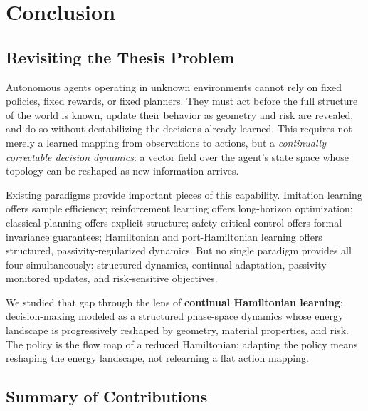 
\chapter{Conclusion}
\label{chap:conclusion}

\section{Revisiting the Thesis Problem}
\label{sec:ch8:problem}

Autonomous agents operating in unknown environments cannot rely on
fixed policies, fixed rewards, or fixed planners.
They must act before the full structure of the world is known, update
their behavior as geometry and risk are revealed, and do so without
destabilizing the decisions already learned.
This requires not merely a learned mapping from observations to actions,
but a \emph{continually correctable decision dynamics}: a vector field
over the agent's state space whose topology can be reshaped as new
information arrives.

Existing paradigms provide important pieces of this capability.
Imitation learning offers sample efficiency; reinforcement learning
offers long-horizon optimization; classical planning offers explicit
structure; safety-critical control offers formal invariance guarantees;
Hamiltonian and port-Hamiltonian learning offers structured,
passivity-regularized dynamics.
But no single paradigm provides all four simultaneously: structured
dynamics, continual adaptation, passivity-monitored updates, and
risk-sensitive objectives.

We studied that gap through the lens of
\textbf{continual Hamiltonian learning}: decision-making modeled as a
structured phase-space dynamics whose energy landscape is progressively
reshaped by geometry, material properties, and risk.
The policy is the flow map of a reduced Hamiltonian; adapting the
policy means reshaping the energy landscape, not relearning a flat
action mapping.

\section{Summary of Contributions}
\label{sec:ch8:contributions}

